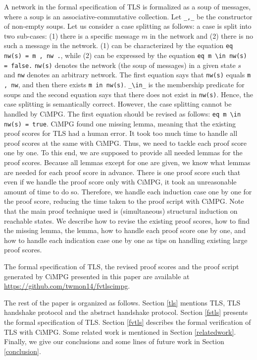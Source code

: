 \documentclass[a4paper,fleqn]{cas-dc}
\begin{document}
A network in the formal specification of TLS is formalized as a soup of messages, where a soup is an associative-commutative collection. Let \verb|_,_| be the constructor of non-empty soups. Let us consider a case splitting as follows: a case is split into two sub-cases: (1) there is a specific message $m$ in the network and (2) there is no such a message in the network. (1) can be characterized by the equation \verb!eq nw(s) = m , nw .!, while (2) can be expressed by the equation \verb!eq m \in nw(s) = false.! \verb!nw(s)! denotes the network (the soup of messages) in a given state $s$ and \verb!nw! denotes an arbitrary network. The first equation says that \verb!nw(s)! equals \verb!m , nw!, and then there exists \verb!m in nw(s)!. \verb|_\in_| is the membership predicate for soups and the second equation says that there does not exist in \verb!nw(s)!. Hence, the case splitting is semantically correct. However, the case splitting cannot be handled by CiMPG. The first equation should be revised as follows: 
\verb!eq m \in nw(s) = true!. CiMPG found one missing lemma, meaning that the existing proof scores for TLS had a human error. It took too much time to handle all proof scores at the same with CiMPG. Thus, we need to tackle each proof score one by one. To this end, we are supposed to provide all needed lemmas for the proof scores. Because all lemmas except for one are given, we know what lemmas are needed for each proof score in advance. There is one proof score such that even if we handle the proof score only with CiMPG, it took an unreasonable amount of time to do so. Therefore, we handle each induction case one by one for the proof score, reducing the time taken to the proof script with CiMPG. Note that the main proof technique used is (simultaneous) structural induction on reachable states. We describe how to revise the existing proof scores, how to find the missing lemma, the lemma, how to handle each proof score one by one, and how to handle each indication case one by one as tips on handling existing large proof scores.

The formal specification of TLS, the revised proof scores and  the proof script generated by CiMPG presented in this paper are available at \url{ https://github.com/twmon14/fvtlscimpg}.

The rest of the paper is organized as follows. Section \ref{tls} mentions TLS, TLS handshake protocol and the abstract handshake protocol. Section \ref{fstls} presents the formal specification of TLS. Section \ref{fvtls} describes the formal verification of TLS with CiMPG. Some related work is mentioned in Section \ref{relatedwork}. Finally, we give our conclusions and some lines of future work in Section \ref{conclusion}.
	
\end{document}
